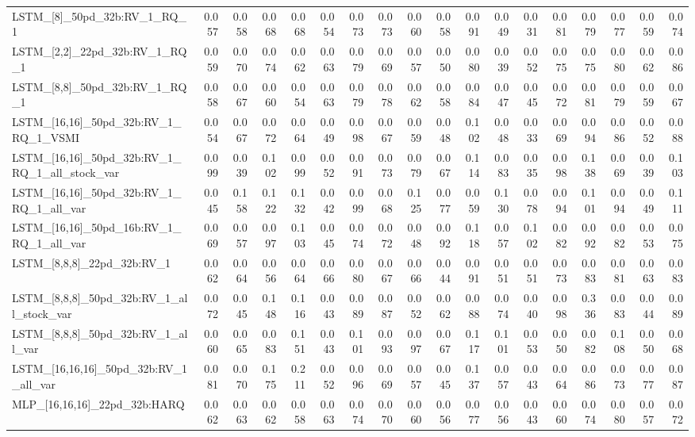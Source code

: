 \begin{tabular}{lrrrrrrrrrrrrrrrrr}
LSTM\_[8]\_50pd\_32b:RV\_1\_RQ\_1 & 0.057 & 0.058 & 0.068 & 0.068 & 0.054 & 0.073 & 0.073 & 0.060 & 0.058 & 0.091 & 0.049 & 0.031 & 0.081 & 0.079 & 0.077 & 0.059 & 0.074 \\
LSTM\_[2,2]\_22pd\_32b:RV\_1\_RQ\_1 & 0.059 & 0.070 & 0.074 & 0.062 & 0.063 & 0.079 & 0.069 & 0.057 & 0.050 & 0.080 & 0.039 & 0.052 & 0.075 & 0.075 & 0.080 & 0.062 & 0.086 \\
LSTM\_[8,8]\_50pd\_32b:RV\_1\_RQ\_1 & 0.058 & 0.067 & 0.060 & 0.054 & 0.063 & 0.079 & 0.078 & 0.062 & 0.058 & 0.084 & 0.047 & 0.045 & 0.072 & 0.081 & 0.079 & 0.059 & 0.067 \\
LSTM\_[16,16]\_50pd\_32b:RV\_1\_RQ\_1\_VSMI & 0.054 & 0.067 & 0.072 & 0.064 & 0.049 & 0.098 & 0.067 & 0.059 & 0.048 & 0.102 & 0.048 & 0.033 & 0.069 & 0.094 & 0.086 & 0.052 & 0.088 \\
LSTM\_[16,16]\_50pd\_32b:RV\_1\_RQ\_1\_all\_stock\_var & 0.099 & 0.039 & 0.102 & 0.099 & 0.052 & 0.091 & 0.073 & 0.079 & 0.067 & 0.114 & 0.083 & 0.035 & 0.098 & 0.138 & 0.069 & 0.039 & 0.103 \\
LSTM\_[16,16]\_50pd\_32b:RV\_1\_RQ\_1\_all\_var & 0.045 & 0.158 & 0.122 & 0.132 & 0.042 & 0.099 & 0.068 & 0.125 & 0.077 & 0.059 & 0.130 & 0.078 & 0.094 & 0.101 & 0.094 & 0.049 & 0.111 \\
LSTM\_[16,16]\_50pd\_16b:RV\_1\_RQ\_1\_all\_var & 0.069 & 0.057 & 0.097 & 0.103 & 0.045 & 0.074 & 0.072 & 0.048 & 0.092 & 0.118 & 0.057 & 0.102 & 0.082 & 0.092 & 0.082 & 0.053 & 0.075 \\
LSTM\_[8,8,8]\_22pd\_32b:RV\_1 & 0.062 & 0.064 & 0.056 & 0.064 & 0.066 & 0.080 & 0.067 & 0.066 & 0.044 & 0.091 & 0.051 & 0.051 & 0.073 & 0.083 & 0.081 & 0.063 & 0.083 \\
LSTM\_[8,8,8]\_50pd\_32b:RV\_1\_all\_stock\_var & 0.072 & 0.045 & 0.148 & 0.116 & 0.043 & 0.089 & 0.087 & 0.052 & 0.062 & 0.088 & 0.074 & 0.040 & 0.098 & 0.336 & 0.083 & 0.044 & 0.089 \\
LSTM\_[8,8,8]\_50pd\_32b:RV\_1\_all\_var & 0.060 & 0.065 & 0.083 & 0.151 & 0.043 & 0.101 & 0.093 & 0.097 & 0.067 & 0.117 & 0.101 & 0.053 & 0.050 & 0.082 & 0.108 & 0.050 & 0.068 \\
LSTM\_[16,16,16]\_50pd\_32b:RV\_1\_all\_var & 0.081 & 0.070 & 0.175 & 0.211 & 0.052 & 0.096 & 0.069 & 0.057 & 0.045 & 0.137 & 0.057 & 0.043 & 0.064 & 0.086 & 0.073 & 0.077 & 0.087 \\
MLP\_[16,16,16]\_22pd\_32b:HARQ & 0.062 & 0.063 & 0.062 & 0.058 & 0.063 & 0.074 & 0.070 & 0.060 & 0.056 & 0.077 & 0.056 & 0.043 & 0.060 & 0.074 & 0.080 & 0.057 & 0.072 \\

\end{tabular}
